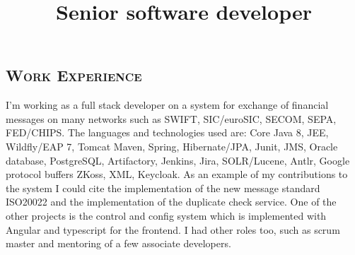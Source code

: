 \begin{resume}
        \section{\textsc{Work Experience}}
        \title{Senior software developer}
        \begin{position}
            I'm working as a full stack developer on a system for exchange of financial messages on many networks such as SWIFT, SIC/euroSIC, SECOM, SEPA, FED/CHIPS.
            The languages and technologies used are: %
            Core Java 8, JEE,
            Wildfly/EAP 7, Tomcat
            Maven, Spring, Hibernate/JPA,
            Junit,
            JMS,
            Oracle database, PostgreSQL,
            Artifactory,
            Jenkins,
            Jira,
            SOLR/Lucene,
            Antlr,
            Google protocol buffers
            ZKoss,
            XML,
            Keycloak.
            As an example of my contributions to the system I could cite the implementation of the new message standard ISO20022 and the implementation of the duplicate check service.
            One of the other projects is the control and config system which is implemented with Angular and typescript for the frontend.
            I had other roles too, such as scrum master and mentoring of a few associate developers.
        \end{position}

\end{resume}
